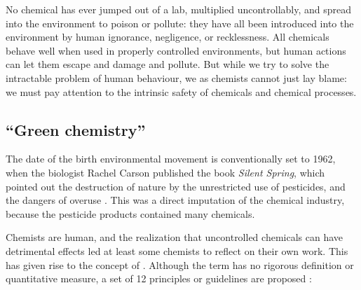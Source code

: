 No chemical has ever jumped out of a lab, multiplied uncontrollably, and spread
into the environment to poison or pollute: they have all been introduced into
the environment by human ignorance, negligence, or recklessness. All chemicals
behave well when used in properly controlled environments, but human actions can
let them escape and damage and pollute. But while we try to solve the
intractable problem of human behaviour, we as chemists cannot just lay blame: we
must pay attention to the intrinsic safety of chemicals and chemical processes.
 
\subsection{``Green chemistry''}
\label{sec:GreenChemistry}
The date of the birth environmental movement is conventionally set to 1962, when
the biologist Rachel Carson published the book \textit{Silent Spring}, which
pointed out the destruction of nature by the unrestricted use of pesticides, and
the dangers of overuse \autocite{Carson1962}. This was a direct imputation of
the chemical industry, because the pesticide products contained many chemicals.

Chemists are human, and the realization that uncontrolled chemicals can have
detrimental effects led at least some chemists to reflect on their own work.
This has given rise to the concept of . Although the
term has no rigorous definition or quantitative measure\autocite{Linthorst2010},
a set of 12 principles or guidelines are proposed \autocite{Anastas1998}:

